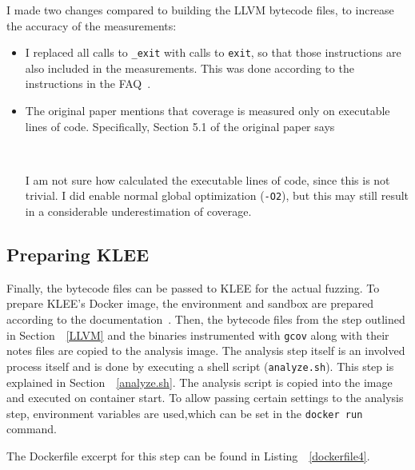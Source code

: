 \documentclass{article}
\let\savedCite=\cite
\renewcommand{\cite}{\unskip~\savedCite}
\let\savedRef=\ref
\renewcommand{\ref}{\unskip~\savedRef}
\begin{document}
I made two changes compared to building the LLVM bytecode files, to increase the accuracy of the measurements:
\begin{itemize}
    \item I replaced all calls to \lstinline{_exit} with calls to \lstinline{exit}, so that those instructions are also included in the measurements. This was done according to the instructions in the FAQ\cite{KLEEFAQ}.
    \item The original paper mentions that coverage is measured only on executable lines of code. Specifically, Section 5.1 of the original paper says
          \begin{displayquote}
              \cite{KLEE}
          \end{displayquote}
          I am not sure how \citeauthor{KLEE} calculated the executable lines of code, since this is not trivial. I did enable normal global optimization (\lstinline{-O2}), but this may still result in a considerable underestimation of coverage.
\end{itemize}

\subsection{Preparing KLEE}

Finally, the bytecode files can be passed to KLEE for the actual fuzzing. To prepare KLEE's Docker image, the environment and sandbox are prepared according to the documentation\cite{KLEEFAQ}. Then, the bytecode files from the step outlined in Section~\ref{LLVM} and the binaries instrumented with \lstinline{gcov} along with their notes files are copied to the analysis image. The analysis step itself is an involved process itself and is done by executing a shell script (\lstinline{analyze.sh}). This step is explained in Section~\ref{analyze.sh}. The analysis script is copied into the image and executed on container start. To allow passing certain settings to the analysis step, environment variables are used,which can be set in the \lstinline{docker run} command.

The Dockerfile excerpt for this step can be found in Listing~\ref{dockerfile4}.


\end{document}
